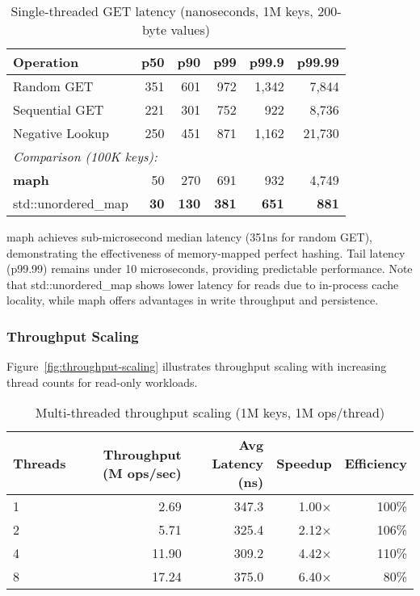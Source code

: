 \documentclass[10pt,conference]{IEEEtran}
\begin{document}
\begin{table}[htbp]
\centering
\caption{Single-threaded GET latency (nanoseconds, 1M keys, 200-byte values)}
\label{tab:latency}
\begin{tabular}{lrrrrr}
\toprule
Operation & p50 & p90 & p99 & p99.9 & p99.99 \\
\midrule
Random GET & 351 & 601 & 972 & 1,342 & 7,844 \\
Sequential GET & 221 & 301 & 752 & 922 & 8,736 \\
Negative Lookup & 250 & 451 & 871 & 1,162 & 21,730 \\
\midrule
\multicolumn{6}{l}{\textit{Comparison (100K keys):}} \\
\textbf{maph} & 50 & 270 & 691 & 932 & 4,749 \\
std::unordered\_map & \textbf{30} & \textbf{130} & \textbf{381} & \textbf{651} & \textbf{881} \\
\bottomrule
\end{tabular}
\end{table}

maph achieves sub-microsecond median latency (351ns for random GET), demonstrating the effectiveness of memory-mapped perfect hashing. Tail latency (p99.99) remains under 10 microseconds, providing predictable performance. Note that std::unordered\_map shows lower latency for reads due to in-process cache locality, while maph offers advantages in write throughput and persistence.

\subsubsection{Throughput Scaling}
Figure~\ref{fig:throughput-scaling} illustrates throughput scaling with increasing thread counts for read-only workloads.

\begin{table}[htbp]
\centering
\caption{Multi-threaded throughput scaling (1M keys, 1M ops/thread)}
\label{tab:throughput}
\begin{tabular}{lrrrr}
\toprule
Threads & Throughput (M ops/sec) & Avg Latency (ns) & Speedup & Efficiency \\
\midrule
1 & 2.69 & 347.3 & 1.00× & 100\% \\
2 & 5.71 & 325.4 & 2.12× & 106\% \\
4 & 11.90 & 309.2 & 4.42× & 110\% \\
8 & 17.24 & 375.0 & 6.40× & 80\% \\
\bottomrule
\end{tabular}
\end{table}
\end{document}
